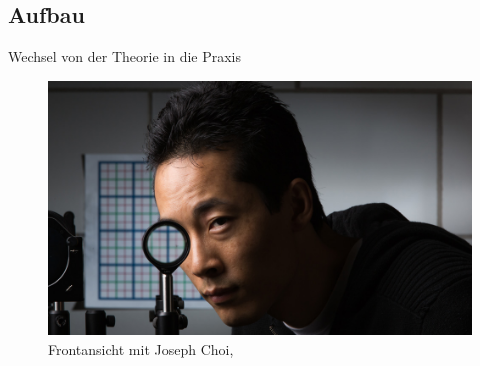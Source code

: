 \subsection{Aufbau}
\begin{frame}{Wechsel von der Theorie in die Praxis}
  \begin{figure}
    \centering
    \caption{Frontansicht mit Joseph Choi, \cite{rochester}}
    \includegraphics[height=0.8\textheight]{images/auge.jpg}
  \end{figure}

\end{frame}

